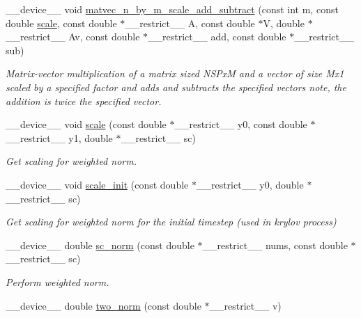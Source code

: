 \begin{DoxyCompactItemize}
\+\_\+\+\_\+device\+\_\+\+\_\+ void \hyperlink{exponential__linear__algebra_8cuh_a0522be133cda40ce325a2af6d95daddb}{matvec\+\_\+n\+\_\+by\+\_\+m\+\_\+scale\+\_\+add\+\_\+subtract} (const int m, const double \hyperlink{radau2a_8cu_a4fab5866449108992478041d2e51a28c}{scale}, const double $\ast$\+\_\+\+\_\+restrict\+\_\+\+\_\+ A, const double $\ast$V, double $\ast$\+\_\+\+\_\+restrict\+\_\+\+\_\+ Av, const double $\ast$\+\_\+\+\_\+restrict\+\_\+\+\_\+ add, const double $\ast$\+\_\+\+\_\+restrict\+\_\+\+\_\+ sub)
\begin{DoxyCompactList}\small\item\em Matrix-\/vector multiplication of a matrix sized N\+S\+PxM and a vector of size Mx1 scaled by a specified factor and adds and subtracts the specified vectors note, the addition is twice the specified vector. \end{DoxyCompactList}\item 
\+\_\+\+\_\+device\+\_\+\+\_\+ void \hyperlink{exponential__linear__algebra_8cuh_ace23ed149f65a9b90469b38ecd9ef01b}{scale} (const double $\ast$\+\_\+\+\_\+restrict\+\_\+\+\_\+ y0, const double $\ast$\+\_\+\+\_\+restrict\+\_\+\+\_\+ y1, double $\ast$\+\_\+\+\_\+restrict\+\_\+\+\_\+ sc)
\begin{DoxyCompactList}\small\item\em Get scaling for weighted norm. \end{DoxyCompactList}\item 
\+\_\+\+\_\+device\+\_\+\+\_\+ void \hyperlink{exponential__linear__algebra_8cuh_a2e7ea5b129b2e703fcc6aeb3affadd64}{scale\+\_\+init} (const double $\ast$\+\_\+\+\_\+restrict\+\_\+\+\_\+ y0, double $\ast$\+\_\+\+\_\+restrict\+\_\+\+\_\+ sc)
\begin{DoxyCompactList}\small\item\em Get scaling for weighted norm for the initial timestep (used in krylov process) \end{DoxyCompactList}\item 
\+\_\+\+\_\+device\+\_\+\+\_\+ double \hyperlink{exponential__linear__algebra_8cuh_a0c015672153032287ee1abbde6487d41}{sc\+\_\+norm} (const double $\ast$\+\_\+\+\_\+restrict\+\_\+\+\_\+ nums, const double $\ast$\+\_\+\+\_\+restrict\+\_\+\+\_\+ sc)
\begin{DoxyCompactList}\small\item\em Perform weighted norm. \end{DoxyCompactList}\item 
\+\_\+\+\_\+device\+\_\+\+\_\+ double \hyperlink{exponential__linear__algebra_8cuh_aa0074f06fcc396f12514f858ab825ca8}{two\+\_\+norm} (const double $\ast$\+\_\+\+\_\+restrict\+\_\+\+\_\+ v)

\end{DoxyCompactItemize}
